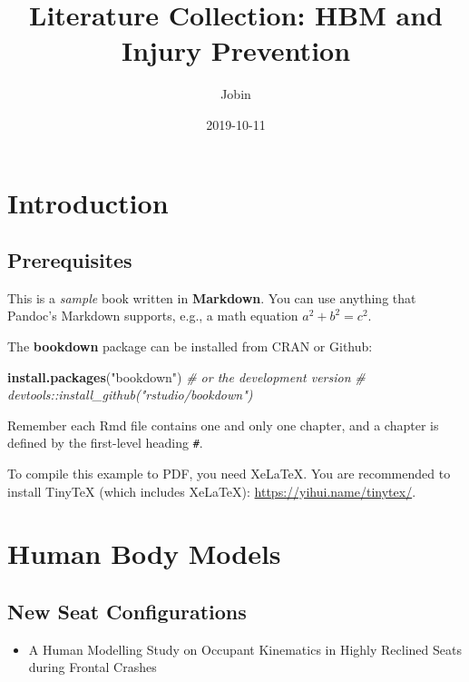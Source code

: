 \documentclass[]{book}
\title{Literature Collection: HBM and Injury Prevention}
\author{Jobin}
\date{2019-10-11}
\newenvironment{Shaded}{\begin{snugshade}}{\end{snugshade}}
\newcommand{\CommentTok}[1]{\textcolor[rgb]{0.56,0.35,0.01}{\textit{#1}}}
\newcommand{\KeywordTok}[1]{\textcolor[rgb]{0.13,0.29,0.53}{\textbf{#1}}}
\newcommand{\NormalTok}[1]{#1}
\newcommand{\StringTok}[1]{\textcolor[rgb]{0.31,0.60,0.02}{#1}}
\providecommand{\tightlist}{%
  \setlength{\itemsep}{0pt}\setlength{\parskip}{0pt}}
\begin{document}
\maketitle

{
\setcounter{tocdepth}{1}
\tableofcontents
}
\hypertarget{introduction}{%
\chapter{Introduction}\label{introduction}}

\hypertarget{prerequisites}{%
\section{Prerequisites}\label{prerequisites}}

This is a \emph{sample} book written in \textbf{Markdown}. You can use anything that Pandoc's Markdown supports, e.g., a math equation \(a^2 + b^2 = c^2\).

The \textbf{bookdown} package can be installed from CRAN or Github:

\begin{Shaded}
\begin{Highlighting}[]
\KeywordTok{install.packages}\NormalTok{(}\StringTok{"bookdown"}\NormalTok{)}
\CommentTok{# or the development version}
\CommentTok{# devtools::install_github("rstudio/bookdown")}
\end{Highlighting}
\end{Shaded}

Remember each Rmd file contains one and only one chapter, and a chapter is defined by the first-level heading \texttt{\#}.

To compile this example to PDF, you need XeLaTeX. You are recommended to install TinyTeX (which includes XeLaTeX): \url{https://yihui.name/tinytex/}.

\hypertarget{human-body-models}{%
\chapter{Human Body Models}\label{human-body-models}}

\hypertarget{new-seat-configurations}{%
\section{New Seat Configurations}\label{new-seat-configurations}}

\begin{itemize}
\tightlist
\item
  A Human Modelling Study on Occupant Kinematics in Highly Reclined Seats during Frontal Crashes \citep{Boyle2019}
\end{itemize}
\end{document}
